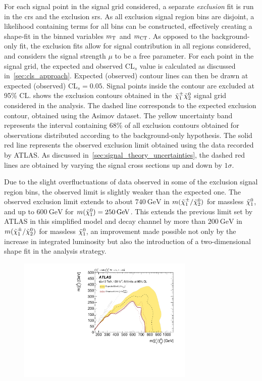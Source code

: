 For each signal point in the signal grid considered, a separate \textit{exclusion} fit is run in the \glspl{cr} and the exclusion \glspl{sr}. As all exclusion signal region bins are disjoint, a likelihood containing terms for all bins can be constructed, effectively creating a shape-fit in the binned variables $m_{\textrm{T}}$ and $m_{\textrm{CT}}$. As opposed to the background-only fit, the exclusion fits allow for signal contribution in all regions considered, and considers the signal strength $\mu$ to be a free parameter. For each point in the signal grid, the expected and observed CL$_s$ value is calculated as discussed in~\cref{sec:cls_approach}. Expected (observed) contour lines can then be drawn at expected (observed) CL$_s =0.05$. Signal points inside the contour are excluded at 95\% CL.  shows the exclusion contours obtained in the $\tilde{\chi}_1^\pm\tilde{\chi}_2^0$ signal grid considered in the analysis. The dashed line corresponds to the expected exclusion contour, obtained using the Asimov dataset. The yellow uncertainty band represents the interval containing 68\% of all exclusion contours obtained for observations distributed according to the background-only hypothesis. The solid red line represents the observed exclusion limit obtained using the data recorded by ATLAS. As discussed in~\cref{sec:signal_theory_uncertainties}, the dashed red lines are obtained by varying the signal cross sections up and down by $1\sigma$.

Due to the slight overfluctuations of data observed in some of the exclusion signal region bins, the observed limit is slightly weaker than the expected one. The observed exclusion limit extends to about $\SI{740}{\GeV}$ in $m(\tilde{\chi}_1^\pm/\tilde{\chi}_2^0)$ for massless $\tilde{\chi}_1^0$, and up to $\SI{600}{\GeV}$ for $m(\lsp)=\SI{250}{\GeV}$. This extends the previous limit set by ATLAS in this simplified model and decay channel by more than $\SI{200}{\GeV}$ in $m(\tilde{\chi}_1^\pm/\tilde{\chi}_2^0)$ for massless $\tilde{\chi}_1^0$, an improvement made possible not only by the increase in integrated luminosity but also the introduction of a two-dimensional shape fit in the analysis strategy. 

 \begin{figure}
	\centering\includegraphics[width=0.75\textwidth]{contourPlotterWh1Lbb}
	\caption{}
	\label{fig:result_exclusion}
\end{figure}


